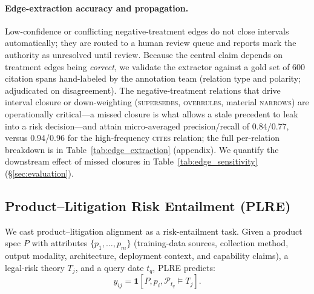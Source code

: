 \paragraph{Edge-extraction accuracy and propagation.} Low-confidence or conflicting negative-treatment edges do not close intervals automatically; they are routed to a human review queue and reports mark the authority as unresolved until review. Because the central claim depends on treatment edges being \emph{correct}, we validate the extractor against a gold set of 600 citation spans hand-labeled by the annotation team (relation type and polarity; adjudicated on disagreement). The negative-treatment relations that drive interval closure or down-weighting (\textsc{supersedes}, \textsc{overrules}, material \textsc{narrows}) are operationally critical---a missed closure is what allows a stale precedent to leak into a risk decision---and attain micro-averaged precision/recall of 0.84/0.77, versus 0.94/0.96 for the high-frequency \textsc{cites} relation; the full per-relation breakdown is in Table~\ref{tab:edge_extraction} (appendix). We quantify the downstream effect of missed closures in Table~\ref{tab:edge_sensitivity} (\S\ref{sec:evaluation}).

\subsection{Product--Litigation Risk Entailment (PLRE)}
\label{sec:plre}

We cast product--litigation alignment as a risk-entailment task. Given a product spec $P$ with attributes $\{p_1,\dots,p_m\}$ (training-data sources, collection method, output modality, architecture, deployment context, and capability claims), a legal-risk theory $T_j$, and a query date $t_q$, PLRE predicts:
\begin{equation}
  y_{ij}=\mathbf{1}[P,p_i,\mathcal{P}_{t_q} \models T_j].
\end{equation}
\begin{table}[t]
\centering
\caption{Schematic PLRE instances (illustrative; not drawn from ALERT-Dataset). The same attribute--theory pair can be positive or negative depending on whether its supporting authority is still operative at $t_q$.}
\label{tab:plre_example}
\small
\setlength{\tabcolsep}{3pt}
\end{table}

